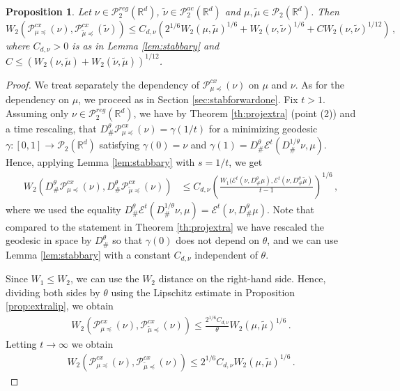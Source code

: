 \documentclass[12pt]{amsart}
\def\mc#1{\mathcal{#1}}
\newtheorem{proposition}{Proposition}
\begin{document}
\begin{proposition}\label{prop:forwardstab} Let $\nu \in \mc{P}^{reg}_2(\mathbb{R}^d)$, $\tilde{\nu} \in \mc{P}^{ac}_2(\mathbb{R}^d)$ and $\mu,\tilde{\mu} \in \mc{P}_2(\mathbb{R}^d)$. Then
\[
W_2(\mathscr{P}_{\mu \preceq }^{cx}(\nu),\mathscr{P}_{\tilde{\mu} \preceq }^{cx}(\tilde{\nu}))\leq C_{d,\nu} ( 2^{1/6} W_2(\mu,\tilde{\mu})^{1/6} + W_2(\nu,\tilde{\nu})^{1/6} + C W_2(\nu,\tilde{\nu})^{1/12})\,,
\]
where $C_{d,\nu}>0$ is as in Lemma \ref{lem:stabbary} and $C\leq  (W_2(\nu,\tilde{\mu}) +W_2(\tilde{\nu},\tilde{\mu}))^{1/12} $.
\end{proposition}
\begin{proof}
We treat separately the dependency of $\mathscr{P}^{cx}_{\mu \preceq}(\nu)$ on $\mu$ and $\nu$.
As for the dependency on $\mu$, 
 we proceed as in Section \ref{sec:stabforwardone}.  Fix $t>1$.  Assuming only $\nu \in \mc{P}_2^{{reg}}(\mathbb{R}^d)$, we have
by Theorem \ref{th:projextra} (point (2)) and a time rescaling,
 that $ D^\theta_\#\mathscr{P}_{\mu \preceq }^{cx}(\nu) = {\gamma}(1/t)$ for a minimizing geodesic ${\gamma}:[0,1]\rightarrow \mc{P}_2(\mathbb{R}^d)$ satisfying ${\gamma}(0)= \nu$ and ${\gamma}(1) = D^\theta_\#\mathscr{E}^t(D^{1/\theta}_\#\nu, \mu)$. Hence, applying Lemma \ref{lem:stabbary} with $s=1/t$, we get 
\begin{equation}\label{eq:forwardestimate}
\begin{aligned}
W_2(D^\theta_\#\mathscr{P}_{\mu \preceq }^{cx}(\nu), D^\theta_\#\mathscr{P}_{\tilde{\mu} \preceq }^{cx}(\nu))&\leq C_{d,\nu} \left( \frac{W_1(\mathscr{E}^t( \nu, D^\theta_\#\mu),\mathscr{E}^t({\nu},  D^\theta_\#\tilde{\mu})}{t-1}\right)^{1/6}\,,
\end{aligned}
\end{equation} 
where we used the equality $D^\theta_\#\mathscr{E}^t(D^{1/\theta}_\#\nu, \mu)= \mathscr{E}^t(\nu,D^\theta_\# \mu)$. Note that compared to the statement in Theorem \ref{th:projextra} we have rescaled the geodesic in space by $D^\theta_\#$ so that $\gamma(0)$ does not depend on $\theta$, and we can use Lemma \ref{lem:stabbary} with a constant $C_{d,\nu}$ independent of $\theta$. 

Since $W_1\leq W_2$, we can use the $W_2$ distance on the right-hand side.
Hence, dividing both sides by $\theta$ using the Lipschitz estimate in Proposition \ref{prop:extralip}, we obtain
\begin{align*}
W_2(\mathscr{P}_{\mu \preceq }^{cx}(\nu),\mathscr{P}_{\tilde{\mu} \preceq }^{cx}(\nu)) \leq \frac{2^{1/6}C_{d,\nu}}{\theta} W_2(\mu,\tilde{\mu})^{1/6}\,.
\end{align*}
Letting $t\rightarrow \infty$ we obtain
\begin{align}\label{eq:forward-mu-tildemu}
W_2(\mathscr{P}_{\mu \preceq }^{cx}(\nu),\mathscr{P}_{\tilde{\mu} \preceq }^{cx}(\nu)) \leq 2^{1/6}C_{d,\nu} W_2(\mu,\tilde{\mu})^{1/6}\,.
\end{align}


\end{proof}
\end{document}
